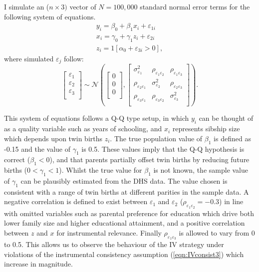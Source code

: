 \documentclass{article}[11pt,subeqn]
\begin{document}
\begin{spacing}{1.5}
I simulate an ($n \times 3)$ vector of $N=100,000$ standard normal error terms for the following system of equations.
\begin{eqnarray}
\label{eqn:MC1}
y_i=\beta_0+\beta_1 x_i + \varepsilon_{1i} \nonumber\\
x_i=\gamma_0 + \gamma_1 z_i + \varepsilon_{2i} \nonumber\\
z_i=1[\alpha_0+\varepsilon_{3i}>0], \nonumber
\end{eqnarray} 
where simulated $\varepsilon_j$ follow:
\begin{equation}
\begin{bmatrix}
\varepsilon_1\\
\varepsilon_2\\
\varepsilon_3\\
\end{bmatrix}
\sim \mathcal{N}
\left(\begin{bmatrix}
0\\
0\\
0\\
\end{bmatrix}
,
\begin{bmatrix}
\sigma_{\varepsilon_1}^2 &  \rho_{\varepsilon_1\varepsilon_2} &  \rho_{\varepsilon_1\varepsilon_3}\\
\rho_{\varepsilon_2\varepsilon_1} & \sigma_{\varepsilon_2}^2 &  \rho_{\varepsilon_2\varepsilon_3} \\
\rho_{\varepsilon_3\varepsilon_1}&  \rho_{\varepsilon_3\varepsilon_2}& \sigma_{\varepsilon_3}^2 \\
\end{bmatrix}\right).
\end{equation}

This system of equations follows a Q-Q type setup, in which $y_i$ can be thought of as a quality variable such as years of schooling, and $x_i$ represents
sibship size which depends upon twin births $z_i$. The true population value of $\beta_1$ is defined as -0.15 and the value of $\gamma_1$ is 0.5.  These
values imply that the Q-Q hypothesis is correct ($\beta_1<0$), and that parents partially offset twin births by reducing future births ($0<\gamma_1<1$).
Whilst the true value for $\beta_1$ is not known, the sample value of $\gamma_1$ can be plausibly estimated from the DHS data.  The  value chosen is consistent
with a range of twin births at different parities in the sample data.
A negative correlation is defined to exist between $\varepsilon_1$ and $\varepsilon_2$ ($\rho_{\varepsilon_1\varepsilon_2}=-0.3$) in line with omitted variables such as
parental preference for education which drive both lower family size and higher educational attainment, and a positive correlation between $z$ and $x$ for
instrumental relevance. %
Finally $\rho_{\varepsilon_1\varepsilon_3}$ is allowed to vary from 0 to 0.5.  This allows
us to observe the behaviour of the IV strategy under violations of the instrumental consistency assumption (\ref{eqn:IVconsist3}) which increase in magnitude.


\end{spacing}
\end{document}
